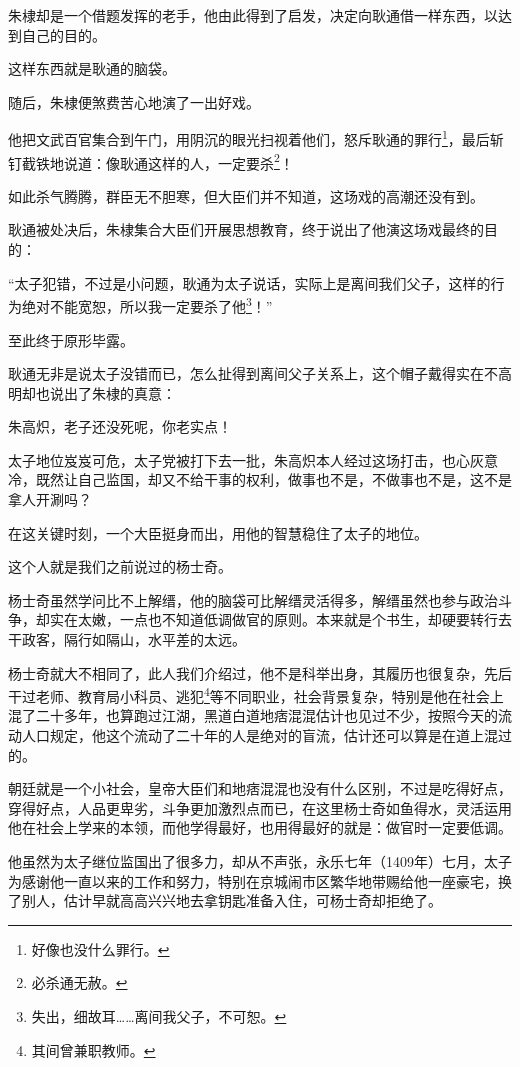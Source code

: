 \begin{multicols}{\theparacolNo}
朱棣却是一个借题发挥的老手，他由此得到了启发，决定向耿通借一样东西，以达到自己的目的。

这样东西就是耿通的脑袋。

随后，朱棣便煞费苦心地演了一出好戏。

他把文武百官集合到午门，用阴沉的眼光扫视着他们，怒斥耿通的罪行\footnote{好像也没什么罪行。}，最后斩钉截铁地说道：像耿通这样的人，一定要杀\footnote{必杀通无赦。}！

如此杀气腾腾，群臣无不胆寒，但大臣们并不知道，这场戏的高潮还没有到。

耿通被处决后，朱棣集合大臣们开展思想教育，终于说出了他演这场戏最终的目的：

“太子犯错，不过是小问题，耿通为太子说话，实际上是离间我们父子，这样的行为绝对不能宽恕，所以我一定要杀了他\footnote{失出，细故耳……离间我父子，不可恕。}！”

至此终于原形毕露。

耿通无非是说太子没错而已，怎么扯得到离间父子关系上，这个帽子戴得实在不高明却也说出了朱棣的真意：

朱高炽，老子还没死呢，你老实点！

太子地位岌岌可危，太子党被打下去一批，朱高炽本人经过这场打击，也心灰意冷，既然让自己监国，却又不给干事的权利，做事也不是，不做事也不是，这不是拿人开涮吗？

在这关键时刻，一个大臣挺身而出，用他的智慧稳住了太子的地位。

这个人就是我们之前说过的杨士奇。

杨士奇虽然学问比不上解缙，他的脑袋可比解缙灵活得多，解缙虽然也参与政治斗争，却实在太嫩，一点也不知道低调做官的原则。本来就是个书生，却硬要转行去干政客，隔行如隔山，水平差的太远。

杨士奇就大不相同了，此人我们介绍过，他不是科举出身，其履历也很复杂，先后干过老师、教育局小科员、逃犯\footnote{其间曾兼职教师。}等不同职业，社会背景复杂，特别是他在社会上混了二十多年，也算跑过江湖，黑道白道地痞混混估计也见过不少，按照今天的流动人口规定，他这个流动了二十年的人是绝对的盲流，估计还可以算是在道上混过的。

朝廷就是一个小社会，皇帝大臣们和地痞混混也没有什么区别，不过是吃得好点，穿得好点，人品更卑劣，斗争更加激烈点而已，在这里杨士奇如鱼得水，灵活运用他在社会上学来的本领，而他学得最好，也用得最好的就是：做官时一定要低调。

他虽然为太子继位监国出了很多力，却从不声张，永乐七年（1409年）七月，太子为感谢他一直以来的工作和努力，特别在京城闹市区繁华地带赐给他一座豪宅，换了别人，估计早就高高兴兴地去拿钥匙准备入住，可杨士奇却拒绝了。


\end{multicols}
